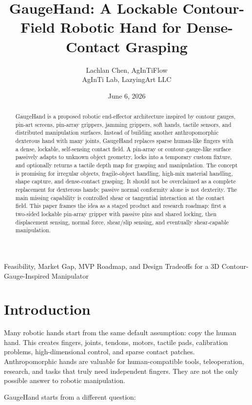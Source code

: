 \documentclass[11pt]{article}
\title{\vspace{-1.1cm}\textbf{GaugeHand: A Lockable Contour-Field Robotic Hand for Dense-Contact Grasping}}
\author{Lachlan Chen, AgInTiFlow\\AgInTi Lab, LazyingArt LLC}
\date{June 6, 2026}
\newcommand{\GaugeHand}{GaugeHand}
\begin{document}
\maketitle
\begin{center}
\large Feasibility, Market Gap, MVP Roadmap, and Design Tradeoffs for a 3D Contour-Gauge-Inspired Manipulator
\end{center}
\vspace{0.5em}

\begin{abstract}
\GaugeHand{} is a proposed robotic end-effector architecture inspired by contour gauges, pin-art screens, pin-array grippers, jamming grippers, soft hands, tactile sensors, and distributed manipulation surfaces. Instead of building another anthropomorphic dexterous hand with many joints, \GaugeHand{} replaces sparse human-like fingers with a dense, lockable, self-sensing contact field. A pin-array or contour-gauge-like surface passively adapts to unknown object geometry, locks into a temporary custom fixture, and optionally returns a tactile depth map for grasping and manipulation. The concept is promising for irregular objects, fragile-object handling, high-mix material handling, shape capture, and dense-contact grasping. It should not be overclaimed as a complete replacement for dexterous hands: passive normal conformity alone is not dexterity. The main missing capability is controlled shear or tangential interaction at the contact field. This paper frames the idea as a staged product and research roadmap: first a two-sided lockable pin-array gripper with passive pins and shared locking, then displacement sensing, normal force, shear/slip sensing, and eventually shear-capable manipulation.
\end{abstract}

\tableofcontents
\newpage

\section{Introduction}

Many robotic hands start from the same default assumption: copy the human hand. This creates fingers, joints, tendons, motors, tactile pads, calibration problems, high-dimensional control, and sparse contact patches. Anthropomorphic hands are valuable for human-compatible tools, teleoperation, research, and tasks that truly need independent fingers. They are not the only possible answer to robotic manipulation.

\GaugeHand{} starts from a different question:
\end{document}

